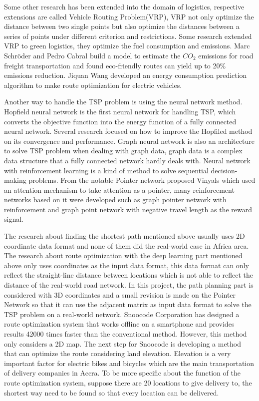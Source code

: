 \documentclass[final-report]{report-template}
\begin{document}
Some other research has been extended into the domain of logistics, 
respective extensions are called Vehicle Routing Problem(VRP)\cite{BRAEKERS2016300}, 
VRP not only optimize the distance between two single points
but also optimize the distances between a series of points under different criterion and restrictions. 
Some research extended VRP to green logistics, 
they optimize the fuel consumption and emissions\cite{green_vehicle}.
Marc Schröder and Pedro Cabral\cite{article} build a model to estimate the $CO_2$ emissions for road freight transportation and found eco-friendly routes can yield up to 20\% emissions reduction.
Jiquan Wang\cite{battery_predict} developed an energy consumption prediction algorithm to make route optimization for electric vehicles.

Another way to handle the TSP problem is using the neural network method\cite{SHI2022681}.
Hopfield neural network\cite{Hopfield:1985aa} is the first neural network for handling TSP, 
which converts the objective function into the energy function of a fully connected neural network.
Several research focused on how to improve the Hopfiled method on its convergence\cite{Luo2019DesignAI} and performance\cite{10.1007/s00521-018-3535-9}\cite{improv_hop}.
Graph neural network is also an architecture to solve TSP problem\cite{graph_neural} when dealing with graph data, 
graph data is a complex data structure that a fully connected network hardly deals with.
Neural network with reinforcement learning\cite{vanOtterlo2012} is a kind of method to solve sequential decision-making problems.
From the notable Pointer network proposed Vinyals\cite{vinyals2017pointer} which used an attention mechanism to take attention as a pointer, 
many reinforcement networks based on it were developed such as graph pointer network with reinforcement\cite{ma2019combinatorial} 
and graph point network with negative travel length as the reward signal\cite{bello2017neural}.

The research about finding the shortest path mentioned above usually uses 2D coordinate data format and none of them did the real-world case in Africa area.
The research about route optimization with the deep learning part mentioned above only uses coordinates as the input data format, 
this data format can only reflect the straight-line distance between locations which is not able to reflect the distance of the real-world road network.
In this project, the path planning part is considered with 3D coordinates 
and a small revision is made on the Pointer Network so that it can use the adjacent matrix as input data format to solve the TSP problem on a real-world network.
Snoocode Corporation has designed a route optimization system that works offline on a smartphone and provides 
results 42000 times faster than the conventional method. However, this method only considers a 2D map.
The next step for Snoocode is developing a method that can optimize the route considering land elevation. 
Elevation is a very important factor for electric bikes and bicycles which are the main transportation of delivery companies in Accra.
To be more specific about the function of the route optimization system, suppose there are 20 locations to
give delivery to, the shortest way need to be found so that every location can be delivered. 
\end{document}
